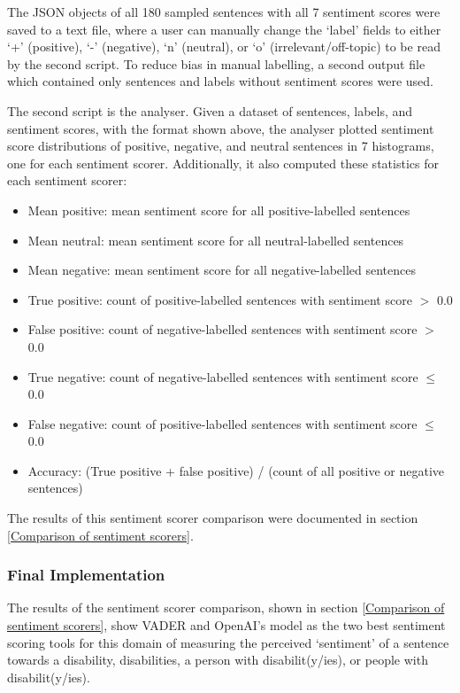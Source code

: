 \documentclass{report}
\begin{document}
The JSON objects of all 180 sampled sentences with all 7 sentiment scores were saved to a text file, where a user can manually change the `label' fields to either `+' (positive), `-' (negative), `n' (neutral), or `o' (irrelevant/off-topic) to be read by the second script.
To reduce bias in manual labelling, a second output file which contained only sentences and labels without sentiment scores were used.

The second script is the analyser.
Given a dataset of sentences, labels, and sentiment scores, with the format shown above, the analyser plotted sentiment score distributions of positive, negative, and neutral sentences in 7 histograms, one for each sentiment scorer.
Additionally, it also computed these statistics for each sentiment scorer:
\begin{itemize}
	\item Mean positive: mean sentiment score for all positive-labelled sentences
	\item Mean neutral: mean sentiment score for all neutral-labelled sentences
	\item Mean negative: mean sentiment score for all negative-labelled sentences
	\item True positive: count of positive-labelled sentences with sentiment score $>$ 0.0
	\item False positive: count of negative-labelled sentences with sentiment score $>$ 0.0 
	\item True negative: count of negative-labelled sentences with sentiment score $\le$ 0.0
	\item False negative: count of positive-labelled sentences with sentiment score $\le$ 0.0
	\item Accuracy: (True positive + false positive) / (count of all positive or negative sentences)
\end{itemize}

The results of this sentiment scorer comparison were documented in section \ref{Comparison of sentiment scorers}.

\subsubsection{Final Implementation} \label{des-sentiment-final}

The results of the sentiment scorer comparison, shown in section \ref{Comparison of sentiment scorers}, show VADER \cite{VADER} and OpenAI's model \cite{OpenAI} as the two best sentiment scoring tools for this domain of measuring the perceived `sentiment' of a sentence towards a disability, disabilities, a person with disabilit(y/ies), or people with disabilit(y/ies).
\end{document}
